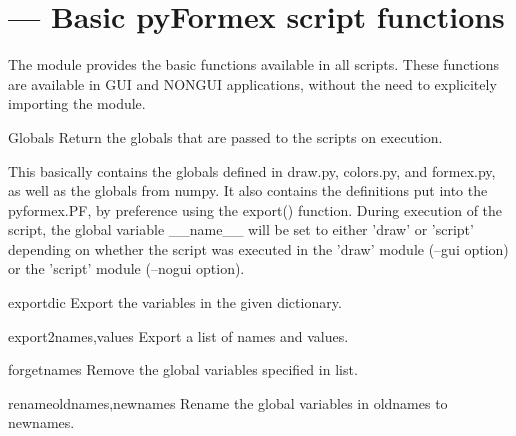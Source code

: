 
\section{ --- Basic pyFormex script functions}
\label{sec:script}


The  module provides the basic functions available
in all \pyformex scripts. These functions are available in GUI and NONGUI
applications, without the need to explicitely importing the 
module.



\begin{funcdesc}{Globals}{}
Return the globals that are passed to the scripts on execution.

    This basically contains the globals defined in draw.py, colors.py,
    and formex.py, as well as the globals from numpy.
    It also contains the definitions put into the pyformex.PF, by
    preference using the export() function.
    During execution of the script, the global variable __name__ will be
    set to either 'draw' or 'script' depending on whether the script
    was executed in the 'draw' module (--gui option) or the 'script'
    module (--nogui option).
    

\end{funcdesc}


\begin{funcdesc}{export}{dic}
Export the variables in the given dictionary.

\end{funcdesc}


\begin{funcdesc}{export2}{names,values}
Export a list of names and values.

\end{funcdesc}


\begin{funcdesc}{forget}{names}
Remove the global variables specified in list.

\end{funcdesc}


\begin{funcdesc}{rename}{oldnames,newnames}
Rename the global variables in oldnames to newnames.

\end{funcdesc}


